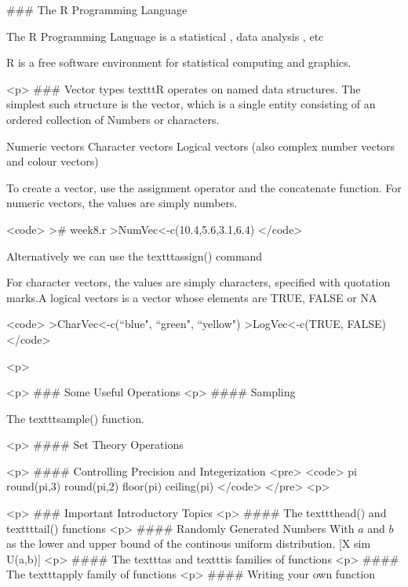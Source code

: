 
### {The R Programming Language}

The R Programming Language is a statistical , data analysis , etc

R is a free software environment for statistical computing and graphics.



<p>
### {Vector types}
texttt{R} operates on named data structures. The simplest such structure is the
vector, which is a single entity consisting of an ordered collection of
Numbers or characters.


Numeric vectors
Character vectors
Logical vectors
(also complex number vectors and colour vectors)


To create a vector, use the assignment operator and the concatenate function.
For numeric vectors, the values are simply numbers.

<code>
># week8.r
>NumVec<-c(10.4,5.6,3.1,6.4)
</code>

Alternatively we can use the texttt{assign()} command

For character vectors, the values are simply characters, specified with
quotation marks.A logical vectors is a vector whose elements are TRUE, FALSE or NA

<code>
>CharVec<-c(``blue", ``green", ``yellow")
>LogVec<-c(TRUE, FALSE)
</code>

<p>






<p>
### {Some Useful Operations}
<p>
#### {Sampling}

The texttt{sample()} function.

<p>
#### {Set Theory Operations}

<p>
#### {Controlling Precision and Integerization}
<pre>
<code>
pi
round(pi,3)
round(pi,2)
floor(pi)
ceiling(pi)
</code>
</pre>
<p>


<p>
### {Important Introductory Topics}
<p>
#### {The texttt{head()} and texttt{tail()} functions}
<p>
#### {Randomly Generated Numbers}
With $a$ and $b$ as the lower and upper bound of the continous uniform distribution.
[X sim U(a,b)]
<p>
#### {The texttt{as} and texttt{is} families of functions}
<p>
#### {The texttt{apply} family of functions}
<p>
#### {Writing your own function}


